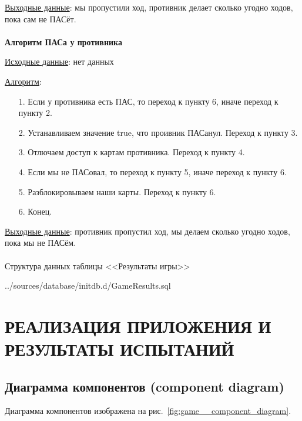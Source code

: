 \documentclass[12pt, a4paper, simple]{eskdtext}
\begin{document}
    \underline{Выходные данные}: мы пропустили ход, противник делает сколько угодно ходов, пока сам не ПАСёт.

    \paragraph{} \textbf{Алгоритм ПАСа у противника}

    \underline{Исходные данные}: нет данных

    \underline{Алгоритм}:

    \begin{enumerate}
        \item[1.] Если у противника есть ПАС, то переход к пункту 6, иначе переход к пункту 2.
        \item[2.] Устанавливаем значение true, что проивник ПАСанул. Переход к пункту 3.
        \item[3.] Отлючаем доступ к картам противника. Переход к пункту 4.
        \item[4.] Если мы не ПАСовал, то переход к пункту 5, иначе переход к пункту 6.
        \item[5.] Разблокировываем наши карты. Переход к пункту 6.
        \item[6.] Конец.
    \end{enumerate}

    \underline{Выходные данные}: противник пропустил ход, мы делаем сколько угодно ходов, пока мы не ПАСём.

    \paragraph{} Структура данных таблицы <<Результаты игры>>

    
        {../sources/database/initdb.d/GameResults.sql}

    \newpage
    
    \section{РЕАЛИЗАЦИЯ ПРИЛОЖЕНИЯ И РЕЗУЛЬТАТЫ ИСПЫТАНИЙ}
    \subsection{Диаграмма компонентов (component diagram)}

    Диаграмма компонентов изображена на рис.~\ref{fig:game__component_diagram}.
\end{document}
